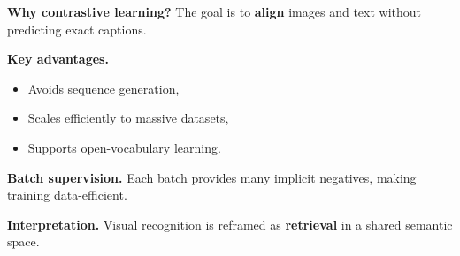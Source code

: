\textbf{Why contrastive learning?}
The goal is to \textbf{align} images and text without predicting exact captions.

\textbf{Key advantages.}
\begin{itemize}
    \item Avoids sequence generation,
    \item Scales efficiently to massive datasets,
    \item Supports open-vocabulary learning.
\end{itemize}

\textbf{Batch supervision.}
Each batch provides many implicit negatives,
making training data-efficient.

\textbf{Interpretation.}
Visual recognition is reframed as \textbf{retrieval}
in a shared semantic space.

